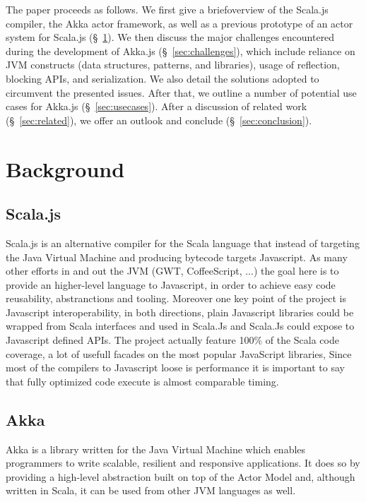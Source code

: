 \documentclass{sig-alternate}
\begin{document}
The paper proceeds as follows. We first give a brief\newline overview of the Scala.js compiler, the Akka actor framework, as well as a previous prototype of an actor system for Scala.js (\S~\ref{sec:background}). We then discuss the major challenges encountered during the development of Akka.js (\S~\ref{sec:challenges}), which include reliance on JVM constructs (data structures, patterns, and libraries), usage of reflection, blocking APIs, and serialization. We also detail the solutions adopted to circumvent the presented issues. After that, we outline a number of potential use cases for Akka.js (\S~\ref{sec:usecases}). After a discussion of related work (\S~\ref{sec:related}), we offer an outlook and conclude (\S~\ref{sec:conclusion}).


\section{Background}\label{sec:background}

\subsection{Scala.js}

Scala.js is an alternative compiler for the Scala language that instead of targeting the Java Virtual Machine and producing bytecode targets Javascript.
As many other efforts in and out the JVM (GWT, CoffeeScript, ...) the goal here is to provide an higher-level language to Javascript, in order to achieve easy code reusability, abstranctions and tooling.
Moreover one key point of the project is Javascript interoperability, in both directions, plain Javascript libraries could be wrapped from Scala interfaces and used in Scala.Js and Scala.Js could expose to Javascript defined APIs.
The project actually feature 100\% of the Scala code coverage, a lot of usefull facades on the most popular JavaScript libraries, 
Since most of the compilers to Javascript loose is performance it is important to say that fully optimized code execute is almost comparable timing.

\subsection{Akka}\label{sec:akka}

Akka is a library written for the Java Virtual Machine which enables programmers to write
scalable, resilient and responsive applications. It does so by providing a high-level
abstraction built on top of the Actor Model and, although written in Scala, it can be used
from other JVM languages as well.
\end{document}
